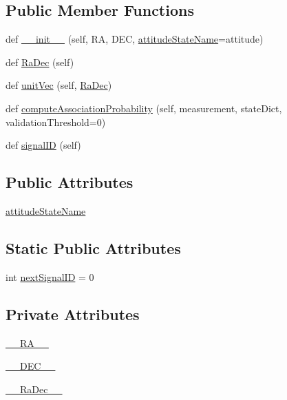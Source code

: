 \subsection*{Public Member Functions}
\begin{DoxyCompactItemize}
\item 
def \hyperlink{classSignals_1_1PointSource_a08c5c8fe52979814a725fac08b34c02f}{\+\_\+\+\_\+init\+\_\+\+\_\+} (self, RA, D\+EC, \hyperlink{classSignals_1_1PointSource_a151f2600c3623d1ca49fb51feb8a1178}{attitude\+State\+Name}=\textquotesingle{}attitude\textquotesingle{})
\item 
def \hyperlink{classSignals_1_1PointSource_a5fbb36eda0901536d77eff9a3262ae9e}{Ra\+Dec} (self)
\item 
def \hyperlink{classSignals_1_1PointSource_aec5f944753a4c097e99da175ec848a92}{unit\+Vec} (self, \hyperlink{classSignals_1_1PointSource_a5fbb36eda0901536d77eff9a3262ae9e}{Ra\+Dec})
\item 
def \hyperlink{classSignals_1_1PointSource_ab1389987fc68312eed77ae3126a21a2a}{compute\+Association\+Probability} (self, measurement, state\+Dict, validation\+Threshold=0)
\item 
def \hyperlink{classSignals_1_1SignalSource_a85016cca8a7f1e188d314ced50577d05}{signal\+ID} (self)
\end{DoxyCompactItemize}
\subsection*{Public Attributes}
\begin{DoxyCompactItemize}
\item 
\hyperlink{classSignals_1_1PointSource_a151f2600c3623d1ca49fb51feb8a1178}{attitude\+State\+Name}
\end{DoxyCompactItemize}
\subsection*{Static Public Attributes}
\begin{DoxyCompactItemize}
\item 
int \hyperlink{classSignals_1_1SignalSource_abcff0d069f17cb5ebe3eff15b6283a64}{next\+Signal\+ID} = 0
\end{DoxyCompactItemize}
\subsection*{Private Attributes}
\begin{DoxyCompactItemize}
\item 
\hyperlink{classSignals_1_1PointSource_ab452ac8a968d9ac8759cb95f60424932}{\+\_\+\+\_\+\+R\+A\+\_\+\+\_\+}
\item 
\hyperlink{classSignals_1_1PointSource_a47e98573bcf62bb6e80f1bcbbdb79620}{\+\_\+\+\_\+\+D\+E\+C\+\_\+\+\_\+}
\item 
\hyperlink{classSignals_1_1PointSource_ac876dc0b41dd3da6bb9b8ec9c41e0dd2}{\+\_\+\+\_\+\+Ra\+Dec\+\_\+\+\_\+}
\end{DoxyCompactItemize}


